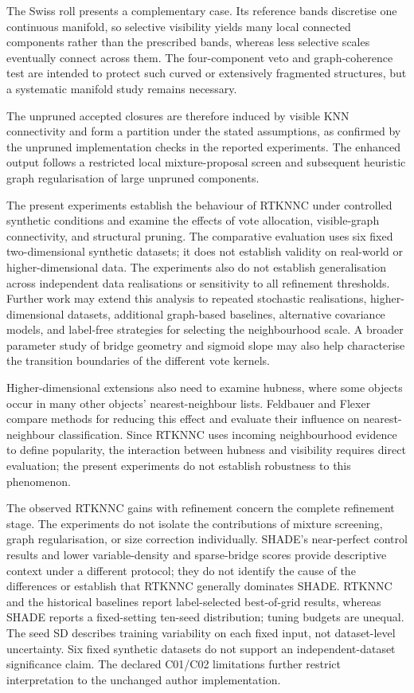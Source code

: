 \documentclass[pdflatex,sn-basic,Numbered]{sn-jnl}
\begin{document}
The Swiss roll presents a complementary case. Its reference bands discretise
one continuous manifold, so selective visibility yields many local connected
components rather than the prescribed bands, whereas less selective scales
eventually connect across them. The four-component veto and graph-coherence
test are intended to protect such curved or extensively fragmented structures,
but a systematic manifold study remains necessary.

The unpruned accepted closures are therefore induced by visible KNN
connectivity and form a partition under the stated assumptions, as
confirmed by the unpruned implementation checks in the reported experiments.
The enhanced output follows a restricted local mixture-proposal screen and
subsequent heuristic graph regularisation of large unpruned components.

The present experiments establish the behaviour of RTKNNC under controlled
synthetic conditions and examine the effects of vote allocation, visible-graph
connectivity, and structural pruning. The comparative evaluation uses six
fixed two-dimensional synthetic datasets; it does not establish validity on
real-world or higher-dimensional data. The experiments also do not establish
generalisation across independent data realisations or sensitivity to all
refinement thresholds. Further work may extend this analysis to
repeated stochastic realisations, higher-dimensional datasets, additional
graph-based baselines, alternative covariance models, and label-free
strategies for selecting the neighbourhood scale. A broader parameter study
of bridge geometry and sigmoid slope may also help characterise the transition
boundaries of the different vote kernels.

Higher-dimensional extensions also need to examine hubness, where some
objects occur in many other objects' nearest-neighbour lists.
Feldbauer and Flexer \citep{FeldbauerFlexer2019Hubness} compare methods for
reducing this effect and evaluate their influence on nearest-neighbour
classification. Since RTKNNC uses incoming neighbourhood evidence to define
popularity, the interaction between hubness and visibility requires direct
evaluation; the present experiments do not establish robustness to this
phenomenon.

The observed RTKNNC gains with refinement concern the complete refinement
stage. The experiments do not isolate the contributions of mixture screening,
graph regularisation, or size correction individually. SHADE's near-perfect
control results and lower variable-density and sparse-bridge scores provide
descriptive context under a different protocol; they do not identify the
cause of the differences or establish that RTKNNC generally dominates SHADE.
RTKNNC and the historical baselines report label-selected best-of-grid
results, whereas SHADE reports a fixed-setting ten-seed distribution;
tuning budgets are unequal. The seed SD describes training variability on
each fixed input, not dataset-level uncertainty. Six fixed synthetic datasets
do not support an independent-dataset significance claim. The declared
C01/C02 limitations further restrict interpretation to the unchanged author
implementation.
\end{document}
